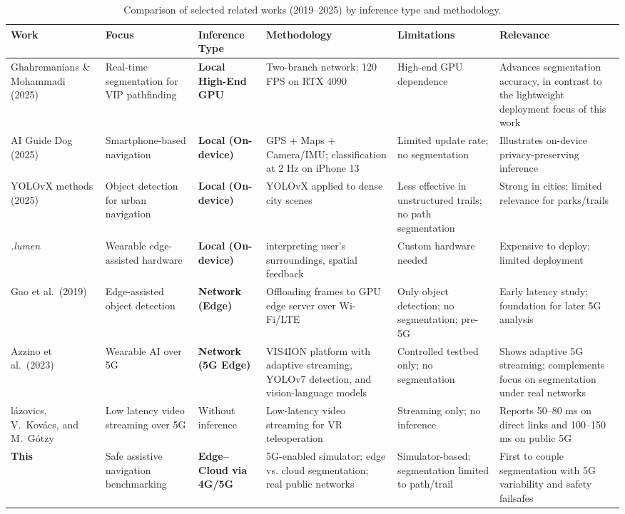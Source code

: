 \documentclass{ieeeaccess}
\begin{document}
\begin{table}[t]
\centering
\caption{Comparison of selected related works (2019--2025) by inference type and methodology.}
\label{tab:relatedworks}
\begin{tabular}{|p{2.4cm}|p{2.4cm}|p{2.0cm}|p{3.2cm}|p{2.5cm}|p{3.0cm}|}
\hline
\textbf{Work} & \textbf{Focus} & \textbf{Inference Type} & \textbf{Methodology} & \textbf{Limitations} & \textbf{Relevance} \\
\hline
\cite{pathfinding2025} Ghahremanians \& Mohammadi (2025) & Real-time segmentation for VIP pathfinding & \textbf{Local High-End GPU} & Two-branch network; 120 FPS on RTX 4090 & High-end GPU dependence & Advances segmentation accuracy, in contrast to the lightweight deployment focus of this work \\
\hline
\cite{chen2025aigd} AI Guide Dog (2025) & Smartphone-based navigation & \textbf{Local (On-device)} & GPS + Maps + Camera/IMU; classification at 2 Hz on iPhone 13 & Limited update rate; no segmentation & Illustrates on-device privacy-preserving inference \\
\hline
\cite{khan2025enhancing,11156811} YOLOvX methods (2025) & Object detection for urban navigation & \textbf{Local (On-device)} & YOLOvX applied to dense city scenes & Less effective in unstructured trails; no path segmentation & Strong in cities; limited relevance for parks/trails \\
\hline
\textit{.lumen}~\cite{dotlumen2025} & Wearable edge-assisted hardware & \textbf{Local (On-device)} & interpreting user’s surroundings, spatial feedback & Custom hardware needed & Expensive to deploy; limited deployment \\
\hline

\cite{gao2019edge} Gao et al.\ (2019) & Edge-assisted object detection & \textbf{Network (Edge)} & Offloading frames to GPU edge server over Wi-Fi/LTE & Only object detection; no segmentation; pre-5G & Early latency study; foundation for later 5G analysis \\
\hline
\cite{azzino2023vis4ion} Azzino et al.\ (2023) & Wearable AI over 5G & \textbf{Network (5G Edge)} & VIS4ION platform with adaptive streaming, YOLOv7 detection, and vision-language models & Controlled testbed only; no segmentation & Shows adaptive 5G streaming; complements focus on segmentation under real networks \\
\hline
\cite{VRLeleop2024IEEE} l\'azovics, V.~Kov\'acs, and M.~G\'otzy & Low latency video streaming over 5G & Without inference & Low-latency video streaming for VR teleoperation & Streaming only; no inference & Reports 50--80 ms on direct links and 100--150 ms on public 5G \\
\hline
\textbf{This} & Safe assistive navigation benchmarking & \textbf{Edge–Cloud via 4G/5G} & 5G-enabled simulator; edge vs. cloud segmentation; real public networks & Simulator-based; segmentation limited to path/trail & First to couple segmentation with 5G variability and safety failsafes \\
\hline
\end{tabular}
\end{table}
\end{document}
